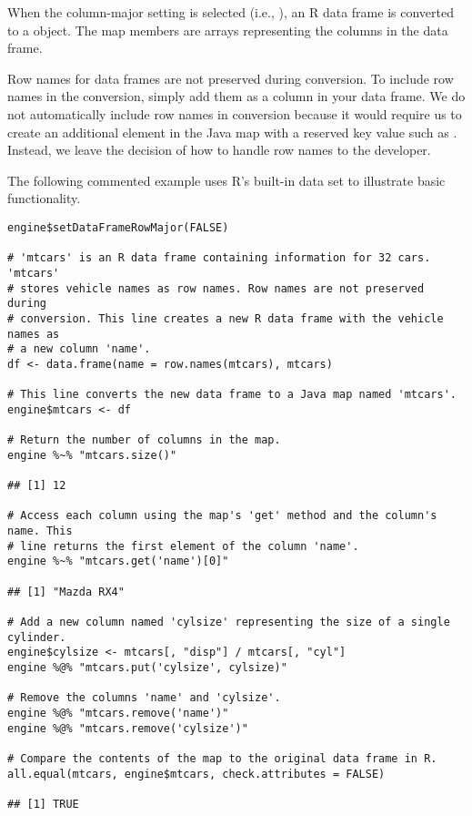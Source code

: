 When the column-major setting is selected (i.e., ), an R data frame is converted to a \href{https://docs.oracle.com/javase/8/docs/api/java/util/LinkedHashMap.html}{} object. The map members are arrays representing the columns in the data frame.

Row names for data frames are not preserved during conversion. To include row names in the conversion, simply add them as a column in your data frame. We do not automatically include row names in conversion because it would require us to create an additional element in the Java map with a reserved key value such as . Instead, we leave the decision of how to handle row names to the developer.

The following commented example uses R's built-in  data set to illustrate basic functionality.

\begin{verbatim}
engine$setDataFrameRowMajor(FALSE)

# 'mtcars' is an R data frame containing information for 32 cars. 'mtcars'
# stores vehicle names as row names. Row names are not preserved during
# conversion. This line creates a new R data frame with the vehicle names as
# a new column 'name'.
df <- data.frame(name = row.names(mtcars), mtcars)

# This line converts the new data frame to a Java map named 'mtcars'.
engine$mtcars <- df

# Return the number of columns in the map.
engine %~% "mtcars.size()"

## [1] 12

# Access each column using the map's 'get' method and the column's name. This
# line returns the first element of the column 'name'.
engine %~% "mtcars.get('name')[0]"

## [1] "Mazda RX4"

# Add a new column named 'cylsize' representing the size of a single cylinder.
engine$cylsize <- mtcars[, "disp"] / mtcars[, "cyl"]
engine %@% "mtcars.put('cylsize', cylsize)"

# Remove the columns 'name' and 'cylsize'.
engine %@% "mtcars.remove('name')"
engine %@% "mtcars.remove('cylsize')"

# Compare the contents of the map to the original data frame in R.
all.equal(mtcars, engine$mtcars, check.attributes = FALSE)

## [1] TRUE
\end{verbatim}

